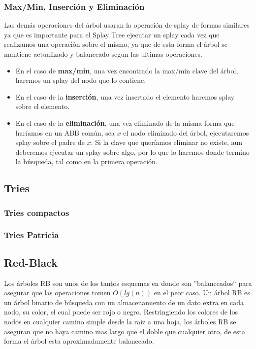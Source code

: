 \documentclass[10pt, a4paper]{report}
\begin{document}
\subsubsection{Max/Min, Inserci\'on y Eliminaci\'on}

Las dem\'as operaciones del \'arbol usaran la operaci\'on de splay de formas similares ya que es importante para el Splay Tree ejecutar un splay cada vez que realizamos una operaci\'on sobre el mismo, ya que de esta forma el \'arbol se mantiene actualizado y balanceado segun las ultimas operaciones.

\begin{itemize}
 \item En el caso de \textbf{max/min}, una vez encontrado la max/min clave del \'arbol, haremos un splay del nodo que lo contiene.
 \item En el caso de la \textbf{inserci\'on}, una vez insertado el elemento haremos splay sobre el elemento.
 \item En el caso de la \textbf{eliminaci\'on}, una vez eliminado de la misma forma que har\'iamos en un ABB com\'un, sea $x$ el nodo eliminado del \'arbol, ejecutaremos splay sobre el padre de $x$. Si la clave que quer\'iamos eliminar no existe, aun deberemos ejecutar un splay sobre algo, por lo que lo haremos donde termino la b\'usqueda, tal como en la primera operaci\'on.
\end{itemize}

\subsection{Tries}
\subsubsection{Tries compactos}
\subsubsection{Tries Patricia}

\subsection{Red-Black}

Los \'arboles RB son unos de los tantos esquemas en donde son ''balanceados`` para asegurar que las operaciones tomen $O(lg(n))$ en el peor caso. Un \'arbol RB es un \'arbol binario de b\'usqueda con un almacenamiento de un dato extra en cada nodo, su color, el cual puede ser rojo o negro. Restringiendo los colores de los nodos en cualquier camino simple desde la ra\'iz a una hoja, los \'arboles RB se aseguran que no haya camino mas largo que el doble que cualquier otro, de esta forma el \'arbol esta aproximadamente balanceado.
\end{document}
